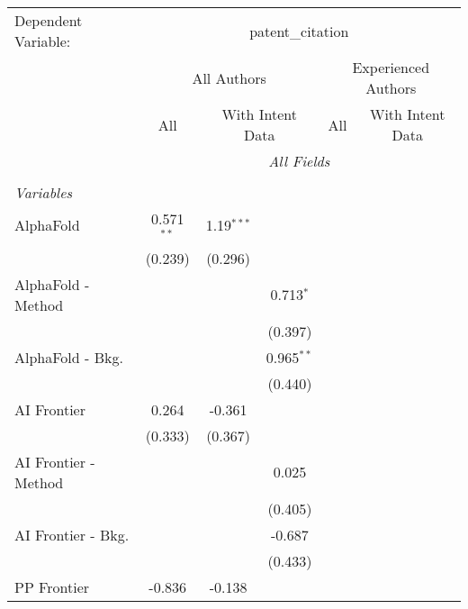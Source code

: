 \begingroup
\centering
\begin{tabular}{lcccccc}
   \tabularnewline \midrule \midrule
   Dependent Variable: & \multicolumn{6}{c}{patent\_citation}\\
 & \multicolumn{3}{c}{All Authors} & \multicolumn{3}{c}{Experienced Authors} \\
\cmidrule(lr){2-4} \cmidrule(lr){5-7}
 & \multicolumn{1}{c}{All} & \multicolumn{2}{c}{With Intent Data} & \multicolumn{1}{c}{All} & \multicolumn{2}{c}{With Intent Data} \\
\cmidrule(lr){2-2} \cmidrule(lr){3-4} \cmidrule(lr){5-5} \cmidrule(lr){6-7}
 & \multicolumn{6}{c}{\textit{All Fields}} \\ \\
   \emph{Variables}\\
   AlphaFold            & 0.571$^{**}$ & 1.19$^{***}$ &              &         &         &   \\   
                        & (0.239)      & (0.296)      &              &         &         &   \\   
   AlphaFold - Method   &              &              & 0.713$^{*}$  &         &         &   \\   
                        &              &              & (0.397)      &         &         &   \\   
   AlphaFold - Bkg.     &              &              & 0.965$^{**}$ &         &         &   \\   
                        &              &              & (0.440)      &         &         &   \\   
   AI Frontier          & 0.264        & -0.361       &              &         &         &   \\   
                        & (0.333)      & (0.367)      &              &         &         &   \\   
   AI Frontier - Method &              &              & 0.025        &         &         &   \\   
                        &              &              & (0.405)      &         &         &   \\   
   AI Frontier - Bkg.   &              &              & -0.687       &         &         &   \\   
                        &              &              & (0.433)      &         &         &   \\   
   PP Frontier          & -0.836       & -0.138       &              &         &         &   \\   

\end{tabular}
